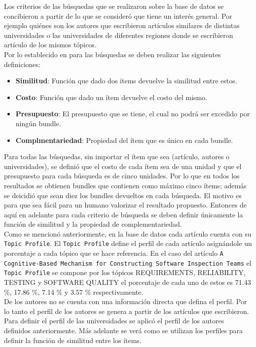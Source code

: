 Los criterios de las búsquedas que se realizaron sobre la base de datos se concibieron a partir de lo que se consideró que tiene un interés general. Por ejemplo quiénes son los autores que escribieron artículos similares de distintas universidades o las universidades de diferentes regiones donde se escribieron artículo de los mismos tópicos.\\
Por lo establecido en \cite{compositeRetrival} para las búsquedas se deben realizar las siguientes definiciones:
\begin{itemize}
  \item \textbf{Similitud}: Función que dado dos ítems devuelve la similitud entre estos.
  \item \textbf{Costo}: Función que dado un ítem devuelve el costo del mismo.
  \item \textbf{Presupuesto}: El presupuesto que se tiene, el cual no podrá ser excedido por ningún bundle.
  \item \textbf{Complmentariedad}: Propiedad del ítem que es único en cada bundle.
\end{itemize}
Para todas las búsquedas, sin importar el ítem que sea (artículo, autores o universidades),  se definió que el costo de cada ítem sea de una unidad y que el presupuesto para cada búsqueda es de cinco unidades. Por lo que en todos los resultados se obtienen bundles que contienen como máximo cinco ítems; además se deicidió que sean diez los bundles devueltos en cada búsqueda. El motivo es para que sea fácil para un humano valorizar el resultado propuesto. Entonces de aquí en adelante para cada criterio de búsqueda se deben definir únicamente la función de similitud y la propiedad de complementariedad.\\
Como se mencionó anteriormente, en la base de datos cada artículo cuenta con su \texttt{Topic Profile}. El \texttt{Topic Profile} define el perfil de cada artículo asignándole un porcentaje a cada tópico que se hace referencia. En el caso del artículo \texttt{A Cognitive-Based Mechanism for Constructing Software Inspection Teams} el \texttt{Topic Profile} se compone por los tópicos  REQUIREMENTS, RELIABILITY, TESTING y SOFTWARE QUALITY el porcentaje de cada uno de estos es 71.43 \%, 17.86 \%, 7.14 \% y 3.57 \% respectivamente. \\
De los autores no se cuenta con una información directa que defina el perfil. Por lo tanto el perfil de los autores se genera a partir de los artículos que escribieron. Para definir el perfil de las universidades se aplicó el perfil de los autores definidos anteriormente. Más adelante se verá como se utilizan los perfiles para definir la función de similitud entre los ítems.\\
